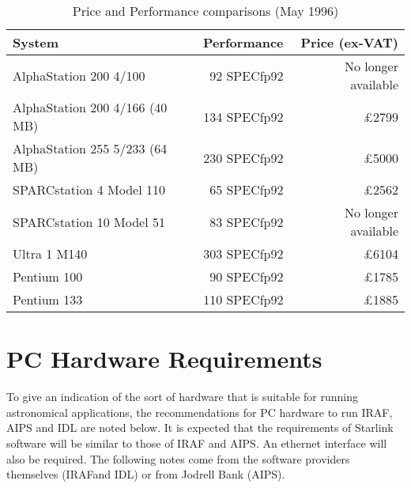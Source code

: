 \documentclass[twoside,11pt]{article}
\newcommand{\htmladdnormallink}[2]{#1}
\newcommand{\AIPS}{\small{AIPS}\normalsize}
\newcommand{\IDL}{\small{IDL}\normalsize}
\newcommand{\IDLref}{\htmladdnormallink{\IDL}{http://rsinc.com/idl/}}
\newcommand{\IRAF}{\small{IRAF}\normalsize}
\newcommand{\IRAFref}{\htmladdnormallink{\IRAF}{http://iraf.noao.edu/iraf-homepage.html}}
\begin{document}
\begin{table}[h]
\begin{center}
\begin {tabular}{|l|r|r|}
\hline
{\bf System}                   & {\bf Performance}  &   {\bf Price (ex-VAT)} \\
\hline
AlphaStation 200 4/100         &    92 SPECfp92 &   No longer available  \\
AlphaStation 200 4/166 (40 MB) &   134 SPECfp92 &   \pounds 2799  \\
AlphaStation 255 5/233 (64 MB) &   230 SPECfp92 &   \pounds 5000  \\
\hline
SPARCstation 4 Model 110       &    65 SPECfp92 &   \pounds 2562  \\
SPARCstation 10 Model 51       &    83 SPECfp92 &   No longer available  \\
Ultra 1 M140                   &   303 SPECfp92 &   \pounds 6104  \\
\hline
Pentium 100                    &    90 SPECfp92 &   \pounds 1785  \\
Pentium 133                    &   110 SPECfp92 &   \pounds 1885  \\
\hline
\end{tabular}
\caption{Price and Performance comparisons (May 1996)}
\end{center}
\end {table}


\section{PC Hardware Requirements}

To give an indication of the sort of hardware that is
suitable for running astronomical applications,
the recommendations for PC hardware to run IRAF, AIPS and IDL
are noted below. It is expected that the requirements of Starlink
software will be similar to those of IRAF and AIPS.  An ethernet
interface will also be required. The following notes come from the
software providers themselves (\IRAFref and \IDLref) or from
Jodrell Bank (\AIPS).
\end{document}
